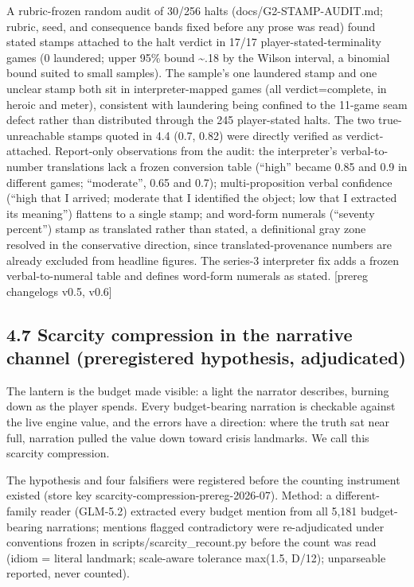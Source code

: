 \documentclass[11pt]{article}
\begin{document}
A rubric-frozen random audit of 30/256 halts (docs/G2-STAMP-AUDIT.md;
rubric, seed, and consequence bands fixed before any prose was read)
found stated stamps attached to the halt verdict in 17/17
player-stated-terminality games (0 laundered; upper 95\% bound
\textasciitilde.18 by the Wilson interval, a binomial bound suited to
small samples). The sample's one laundered stamp and one unclear stamp
both sit in interpreter-mapped games (all verdict=complete, in heroic
and meter), consistent with laundering being confined to the 11-game
seam defect rather than distributed through the 245 player-stated halts.
The two true-unreachable stamps quoted in 4.4 (0.7, 0.82) were directly
verified as verdict-attached. Report-only observations from the audit:
the interpreter's verbal-to-number translations lack a frozen conversion
table (``high'' became 0.85 and 0.9 in different games; ``moderate'',
0.65 and 0.7); multi-proposition verbal confidence (``high that I
arrived; moderate that I identified the object; low that I extracted its
meaning'') flattens to a single stamp; and word-form numerals (``seventy
percent'') stamp as translated rather than stated, a definitional gray
zone resolved in the conservative direction, since translated-provenance
numbers are already excluded from headline figures. The series-3
interpreter fix adds a frozen verbal-to-numeral table and defines
word-form numerals as stated. {[}prereg changelogs v0.5, v0.6{]}

\subsection*{4.7 Scarcity compression in the narrative channel
(preregistered hypothesis, adjudicated)}

The lantern is the budget made visible: a light the narrator describes,
burning down as the player spends. Every budget-bearing narration is
checkable against the live engine value, and the errors have a
direction: where the truth sat near full, narration pulled the value
down toward crisis landmarks. We call this scarcity compression.

The hypothesis and four falsifiers were registered before the counting
instrument existed (store key scarcity-compression-prereg-2026-07).
Method: a different-family reader (GLM-5.2) extracted every budget
mention from all 5,181 budget-bearing narrations; mentions flagged
contradictory were re-adjudicated under conventions frozen in
scripts/scarcity\_recount.py before the count was read (idiom = literal
landmark; scale-aware tolerance max(1.5, D/12); unparseable reported,
never counted).
\end{document}
